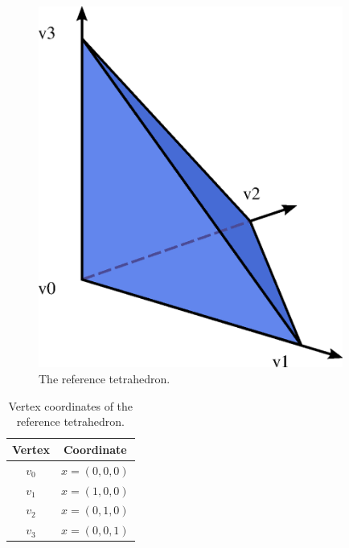 \begin{figure}[H]
  \begin{center}
    \includegraphics[width=10cm]{eps/tetrahedron.eps}
    \caption{The reference tetrahedron.}
    \label{fig:tetrahedron}
  \end{center}
\end{figure}

\begin{table}[H]
\linespread{1.2}\selectfont
  \begin{center}
    \begin{tabular}{|c|c|}
      \hline
      Vertex & Coordinate \\
      \hline
      \hline
      $v_0$ & $x = (0, 0, 0)$ \\
      \hline
      $v_1$ & $x = (1, 0, 0)$ \\
      \hline
      $v_2$ & $x = (0, 1, 0)$ \\
      \hline
      $v_3$ & $x = (0, 0, 1)$ \\
      \hline
    \end{tabular}
    \caption{Vertex coordinates of the reference tetrahedron.}
    \label{tab:tetrahedron,vertices}
  \end{center}
\end{table}

